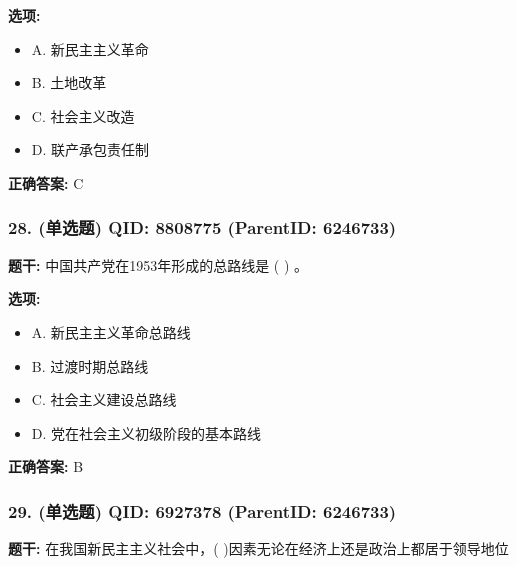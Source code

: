 \documentclass[12pt,UTF8]{ctexart}
\begin{document}
\textbf{选项:}
\begin{itemize}[leftmargin=*]

  \item A. 新民主主义革命

  \item B. 土地改革

  \item C. 社会主义改造

  \item D. 联产承包责任制

\end{itemize}

\textbf{正确答案:}
C

\vspace{0.3em}\hrulefill\vspace{0.7em}

\subsubsection*{28. (单选题) \small QID: 8808775 (ParentID: 6246733)}

\textbf{题干:}
中国共产党在1953年形成的总路线是 ( ) 。



\textbf{选项:}
\begin{itemize}[leftmargin=*]

  \item A. 新民主主义革命总路线

  \item B. 过渡时期总路线

  \item C. 社会主义建设总路线

  \item D. 党在社会主义初级阶段的基本路线

\end{itemize}

\textbf{正确答案:}
B

\vspace{0.3em}\hrulefill\vspace{0.7em}

\subsubsection*{29. (单选题) \small QID: 6927378 (ParentID: 6246733)}

\textbf{题干:}
在我国新民主主义社会中，(         )因素无论在经济上还是政治上都居于领导地位
\end{document}
